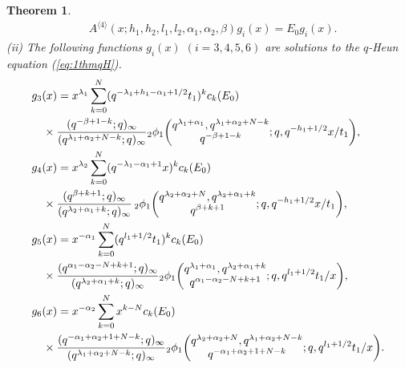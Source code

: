 \documentclass[12pt]{amsart}
\numberwithin{equation}{section}
\newtheorem{thm}{Theorem}[section]
\theoremstyle{definition}
\theoremstyle{remark}
\begin{document}
\begin{thm}
\begin{align}
& A^{\langle 4 \rangle} (x; h_{1}, h_{2}, l_{1}, l_{2}, \alpha_{1}, \alpha_{2}, \beta) g _i (x) = E_0 g _i (x) .
\label{eq:1thmqH}
\end{align}
(ii) The following functions $g _i (x) $ $(i=3,4,5,6)$ are solutions to the $q$-Heun equation (\ref{eq:1thmqH}).
\begin{align*}
& g _3 (x) = x^{ \lambda _{1} } \sum_{k = 0}^{N} (q^{- \lambda _{1} + h_1 - \alpha _{1} + 1/2}t_{1})^{ k} c_{k} (E_0 )  \\
    & \quad \times \frac{(q^{ - \beta + 1 - k}; q)_{\infty}}{(q^{ \lambda _{1} + \alpha _{2} + N - k}; q)_{\infty}} {}_2\phi_1 \biggl( \begin{array}{@{}c@{}} q^{\lambda _{1} + \alpha _{1} }, q^{ \lambda _{1} + \alpha _{2} + N - k} \\
q^{ - \beta + 1 - k} \end{array} ;q,q^{ -h_1 + 1/2}x/t_{1} \biggr) , \\
 &  g _4 (x)  = x^{ \lambda _{2}} \sum_{k = 0}^{N} (q^{ - \lambda _{1} - \alpha _{1}  + 1}x)^{ k} c_{k} (E_0 ) \\
    &\quad \times \frac{(q^{\beta + k  + 1 }; q)_{\infty}}{(q^{ \lambda _{2} + \alpha _{1} + k}; q)_{\infty}} \, {}_2\phi_1 \biggl( \begin{array}{@{}c@{}} q^{\lambda _{2} + \alpha_{2} + N }, q^{ \lambda _{2} + \alpha _{1} + k} \\
q^{\beta  + k  + 1 } \end{array} ;q,q^{ -h_1  + 1/2 }x/t_{1} \biggr) , \\
&  g _5 (x)
   =x^{-\alpha_{1}}  \sum_{k = 0}^{N} (q^{l_{1} + 1/2}t_{1})^{ k} c_{k} (E_0 ) \\
    &\quad \times \frac{(q^{ \alpha_{1} - \alpha_{2} -N + k +1 }; q)_{\infty}}{(q^{ \lambda _{2} + \alpha _{1} + k}; q)_{\infty}}
    {}_2\phi_1 \biggl( \begin{array}{@{}c@{}} q^{\lambda _{1} + \alpha _{1} }, q^{ \lambda _{2} + \alpha _{1} + k} \\
q^{ \alpha_{1} - \alpha_{2} -N + k +1} \end{array} ;q,q^{l_{1} + 1/2}t_{1}/x \biggr) , \\
   & g _6 (x) = x^{ - \alpha _{2} }  \sum_{k = 0}^{N} x^{k-N} c_{k} (E_0 ) \\
    &\quad \times \frac{(q^{ - \alpha _{1} + \alpha _{2} + 1 + N - k}; q)_{\infty}}{(q^{ \lambda _{1} + \alpha _{2} + N - k}; q)_{\infty}} {}_2\phi_1 \biggl( \begin{array}{@{}c@{}} q^{\lambda _{2} + \alpha_{2} + N }, q^{ \lambda _{1} + \alpha _{2} + N - k} \\
q^{- \alpha _{1} + \alpha _{2} + 1 + N - k} \end{array} ;q,q^{l_{1} + 1/2}t_{1}/x \biggr).
  \end{align*}
\end{thm}
\end{document}
